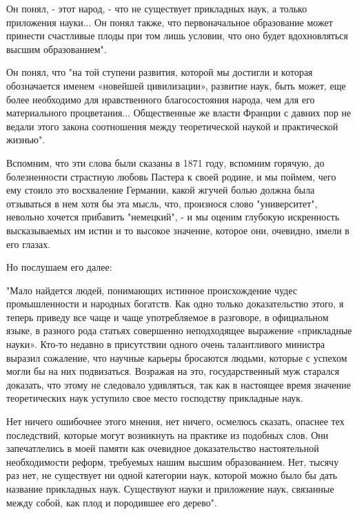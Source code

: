 Он понял, - этот народ, - что не существует прикладных наук, а только
приложения науки... Он понял также, что первоначальное образование
может принести счастливые плоды при том лишь условии, что оно будет
вдохновляться высшим образованием".

Он понял, что "на той ступени развития, которой мы достигли и которая
обозначается именем «новейшей цивилизации», развитие наук, быть может,
еще более необходимо для нравственного благосостояния народа, чем для
его материального процветания... Общественные же власти Франции с
давних пор не ведали этого закона соотношения между теоретической
наукой и практической жизнью".

Вспомним, что эти слова были сказаны  в 1871 году, вспомним горячую,  до
болезненности страстную любовь Пастера к своей родине, и мы поймем, чего
ему стоило  это восхваление  Германии, какой  жгучей болью  должна  была
отзываться в нем хотя бы эта мысль, что, произнося слово  "университет",
невольно  хочется  прибавить   "немецкий",  -  и   мы  оценим   глубокую
искренность высказываемых им истин и  то высокое значение, которое  они,
очевидно, имели в его глазах.

Но послушаем его далее:

"Мало найдется людей, понимающих истинное происхождение чудес
промышленности и народных богатств. Как одно только доказательство
этого, я теперь приведу все чаще и чаще употребляемое в разговоре, в
официальном языке, в разного рода статьях совершенно неподходящее
выражение «прикладные науки». Кто-то недавно в присутствии одного
очень талантливого министра выразил сожаление, что научные карьеры
бросаются людьми, которые с успехом могли бы на них подвизаться.
Возражая на это, государственный муж старался доказать, что этому не
следовало удивляться, так как в настоящее время значение теоретических
наук уступило свое место господству прикладные наук.

Нет ничего ошибочнее этого мнения, нет ничего, осмелюсь сказать,
опаснее тех последствий, которые могут возникнуть на практике из
подобных слов. Они запечатлелись в моей памяти как очевидное
доказательство настоятельной необходимости реформ, требуемых нашим
высшим образованием. Нет, тысячу раз нет, не существует ни одной
категории наук, которой можно было бы дать название прикладных наук.
Существуют науки и приложение наук, связанные между собой, как плод и
породившее его дерево".

